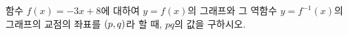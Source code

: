 함수 $f(x)=-3x+8$에 대하여 $y=f(x)$의 그래프와 그 역함수 $y=f^{-1}(x)$의 그래프의 교점의 좌표를 $(p{,}\mkern3mu\mathopen{}q)$라 할 때, $pq$의 값을 구하시오.
